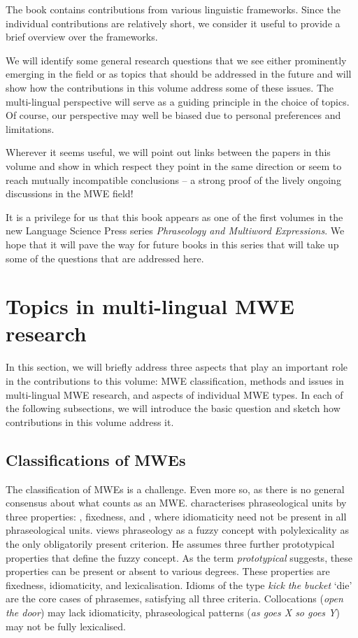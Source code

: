 \documentclass[output=paper]{langsci/langscibook}
\begin{document}
The book contains contributions from various linguistic frameworks. Since the individual contributions are relatively short, we consider it useful to provide a brief overview over the frameworks. 

We will identify some general research questions that we see either prominently emerging in the field or as topics that should be addressed in the future and will show how the contributions in this volume address some of these issues. The multi-lingual perspective will serve as a guiding principle in the choice of topics. Of course, our perspective may well be biased due to personal preferences and limitations. 

Wherever it seems useful, we will point out links between the papers in this volume and show in which respect they point in the same direction or seem to reach mutually incompatible conclusions -- a strong proof of the lively ongoing discussions in the MWE field!

It is a privilege for us that this book appears as one of the first volumes in the new Language Science Press series \emph{Phraseology and Multiword Expressions}. We hope that it will pave the way for future books in this series that will take up some of the questions that are addressed here.


\section{Topics in multi-lingual MWE research}
\label{Sec-Topics}

In this section, we will briefly address three aspects that play an important role in the contributions to this volume: MWE classification, methods and issues in multi-lingual MWE research, and aspects of individual MWE types. In each of the following subsections, we will introduce the basic question and sketch how contributions in this volume address it.

\subsection{Classifications of MWEs}
\label{Sec-Classification}

The classification of MWEs is a challenge. Even more so, as there is no general consensus about what counts as an MWE. 
\citet{Burger:15} characterises phraseolo\-gical units by three properties: , fixedness,  and , where idiomaticity need not be present in all phraseological units. 
\citet{Fleischer:97} views phraseology as a fuzzy concept with polylexicality as the only obligatorily pres\-ent criterion. 
He assumes three further prototypical properties that define the fuzzy concept. 
As the term \emph{prototypical} suggests, these properties can be present or absent to various degrees. These properties are fixedness, idiomaticity, and   lexicalisation. 
Idioms of the type \textit{kick the bucket} `die’ are the core cases of phrasemes, satisfying all three criteria. 
Collocations (\textit{open the door}) may lack idiomaticity, phraseological patterns (\textit{as goes X so goes Y}) may not be fully lexicalised. 
\end{document}
